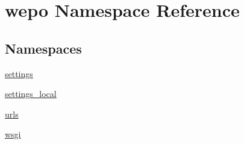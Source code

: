 \hypertarget{namespacewepo}{\section{wepo Namespace Reference}
\label{namespacewepo}
}
\subsection*{Namespaces}
\begin{DoxyCompactItemize}
\item 
\hyperlink{namespacewepo_1_1}{}
\item 
\hyperlink{namespacewepo_1_1settings}{settings}
\item 
\hyperlink{namespacewepo_1_1settings__local}{settings\-\_\-local}
\item 
\hyperlink{namespacewepo_1_1urls}{urls}
\item 
\hyperlink{namespacewepo_1_1wsgi}{wsgi}
\end{DoxyCompactItemize}
